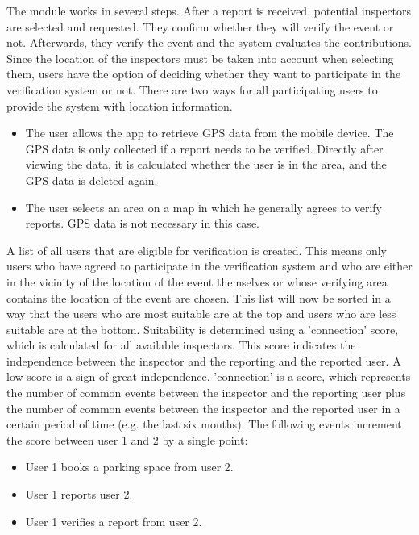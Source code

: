 \documentclass[
a4paper,     %
titlepage,   %
14pt         %
]{scrartcl}  %
\theoremstyle{mystyle}
\begin{document}
The module works in several steps. After a report is received, potential inspectors are selected and requested. They confirm whether they will verify the event or not. Afterwards, they verify the event and the system evaluates the contributions. \\

Since the location of the inspectors must be taken into account when selecting them, users have the option of deciding whether they want to participate in the verification system or not. There are two ways for all participating users to provide the system with location information. 
\begin{itemize}
\item The user allows the app to retrieve GPS data from the mobile device. The GPS data is only collected if a report needs to be verified. Directly after viewing the data, it is calculated whether the user is in the area, and the GPS data is deleted again.
\item The user selects an area on a map in which he generally agrees to verify reports. GPS data is not necessary in this case.
\end{itemize}

A list of all users that are eligible for verification is created. This means only users who have agreed to participate in the verification system and who are either in the vicinity of the location of the event themselves or whose verifying area contains the location of the event are chosen. This list will now be sorted in a way that the users who are most suitable are at the top and users who are less suitable are at the bottom. Suitability is determined using a 'connection' score, which is calculated for all available inspectors. This score indicates the independence between the inspector and the reporting and the reported user. A low score is a sign of great independence. 'connection' is a score, which represents the number of common events between the inspector and the reporting user plus the number of common events between the inspector and the reported user in a certain period of time (e.g. the last six months). The following events increment the score between user 1 and 2 by a single point:
\begin{itemize}
\item User 1 books a parking space from user 2.
\item User 1 reports user 2.
\item User 1 verifies a report from user 2.
\end{itemize}
\end{document}
